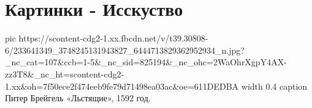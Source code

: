  
 
 
 
 
\section{Картинки - Исскуство}
\label{sec:pics.isskustvo}

\ifcmt
  pic https://scontent-cdg2-1.xx.fbcdn.net/v/t39.30808-6/233641349_3748245131943827_6444713829362952934_n.jpg?_nc_cat=107&ccb=1-5&_nc_sid=825194&_nc_ohc=2WaOhrXgpY4AX-zz3T8&_nc_ht=scontent-cdg2-1.xx&oh=7f50ece2f474eeb9fe79d71498ea03ac&oe=611DEDBA
  width 0.4
	caption Питер Брейгель «Льстящие», 1592 год.
\fi
